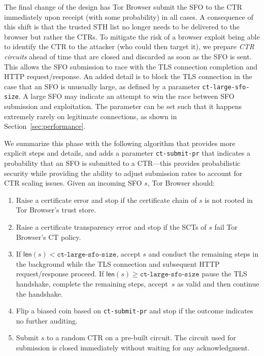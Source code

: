 The final change of the design has Tor Browser submit the SFO to the CTR
immediately upon receipt (with some probability) in all cases. A consequence of
this shift is that the trusted STH list no longer needs to be delivered to the
browser but rather the CTRs. To mitigate the risk of a browser exploit being
able to identify the CTR to the attacker (who could then target it), we prepare
\emph{CTR circuits} ahead of time that are closed and discarded as soon as the
SFO is sent. This allows the SFO submission to race with the TLS connection
completion and HTTP request/response. An added detail is to block the TLS
connection in the case that an SFO is unusually large, as defined by a parameter
\texttt{ct-large-sfo-size}. A large SFO may indicate an attempt to win the race
between SFO submission and exploitation. The parameter can be set such that it
happens extremely rarely on legitimate connections, as shown in
Section~\ref{sec:performance}.

We summarize this phase with the following algorithm that provides more explicit
steps and details, and adds a parameter \texttt{ct-submit-pr} that indicates a
probability that an SFO is submitted to a CTR---this provides probabilistic
security while providing the ability to adjust submission rates to account for
CTR scaling issues. Given an incoming SFO $s$, Tor Browser should:
\begin{enumerate}
    \item Raise a certificate error and stop if the certificate chain of $s$
        is not rooted in Tor Browser's trust store.
    \item Raise a certificate transparency error and stop if the SCTs of $s$
        fail Tor Browser's CT policy.
    \item If $\mathsf{len}(s) < \texttt{ct-large-sfo-size}$, accept $s$ and
        conduct the remaining steps in the background while the TLS connection
        and subsequent HTTP request/response proceed. If $\mathsf{len}(s) \geq
        \texttt{ct-large-sfo-size}$ pause the TLS handshake, complete the
        remaining steps, accept~$s$ as valid and then continue the handshake.
    \item Flip a biased coin based on \texttt{ct-submit-pr} and stop if the
        outcome indicates no further auditing.
    \item Submit $s$ to a random CTR on a pre-built circuit. The circuit used
        for submission is closed immediately without waiting for any
        acknowledgment.
\end{enumerate}


